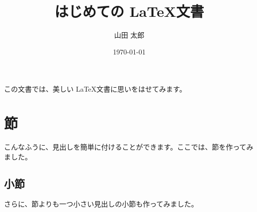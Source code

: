 \documentclass{ltjsarticle}
\title{はじめての \LaTeX 文書}
\author{山田 太郎}
\date{\today}
\begin{document}
\maketitle
この文書では、美しい \LaTeX 文書に思いをはせてみます。
\section{節}
こんなふうに、見出しを簡単に付けることができます。ここでは、節を作ってみました。
\subsection{小節}
さらに、節よりも一つ小さい見出しの小節も作ってみました。
\end{document}
